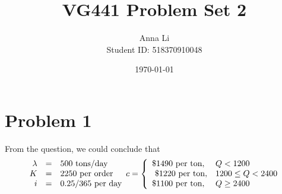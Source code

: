 \documentclass[a4paper,12pt]{journal}
\title{VG441 Problem Set 2}
\author{Anna Li \\Student ID: 518370910048}
\date{\today}
\begin{document}
	\maketitle
	\section*{Problem 1}
	From the question, we could conclude that 
	\begin{equation}
		\begin{array}{r c l}
			\lambda&=& 500\text{ tons/day}\\
			K&=& 2250\text{ per order}\\
			i&=&0.25/365\text{ per day}
		\end{array}\\
	c=\left\{
	\begin{array}{l l}
		\$1490\text{ per ton}, &Q<1200\\\
		\$1220\text{ per ton}, &1200\leq Q<2400\\
		\$1100\text{ per ton}, &Q\geq 2400\\
		\end{array}\right.
	\end{equation}
\end{document}
